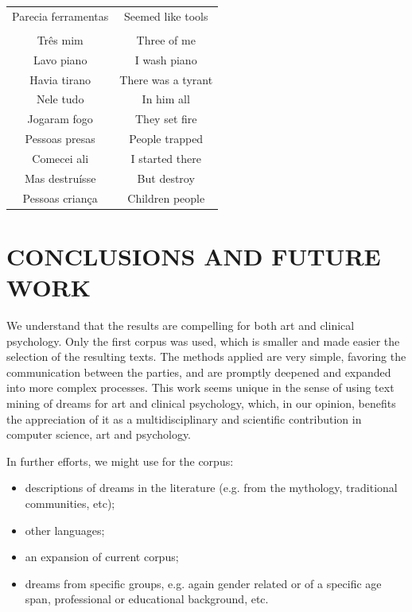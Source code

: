 \documentclass[12pt,fleqn]{article}
\begin{document}
\begin{table}[H]
\begin{tabular}{  c | c }
	Parecia ferramentas              & Seemed like tools                             \\
  & \\
	Três mim          & Three of me \\
	Lavo piano         & I wash piano \\
	Havia tirano & There was a tyrant \\
	Nele tudo & In him all \\
	Jogaram fogo & They set fire \\
	Pessoas presas &  People trapped \\
	Comecei ali & I started there \\
	Mas destruísse & But destroy \\
	Pessoas criança & Children people
\end{tabular}
\end{table}

\newpage %

\section{CONCLUSIONS AND FUTURE WORK}\label{sec:conc}
We understand that the results are compelling for both art and clinical psychology.
Only the first corpus was used, which is smaller and made easier the selection of the resulting texts.
The methods applied are very simple, favoring the communication between the parties,
and are promptly deepened and expanded into more complex processes.
This work seems unique in the sense of using text mining of dreams for art and clinical psychology,
which, in our opinion, benefits the appreciation of it as a multidisciplinary and scientific contribution
in computer science, art and psychology.

In further efforts,
we might use for the corpus:
\begin{itemize}
	\item descriptions of dreams in the literature (e.g. from the mythology, traditional communities, etc); 
	\item other languages;
	\item an expansion of current corpus;
	\item dreams from specific groups, e.g. again gender related or of a specific age span, professional or educational background, etc.
\end{itemize}
\end{document}
